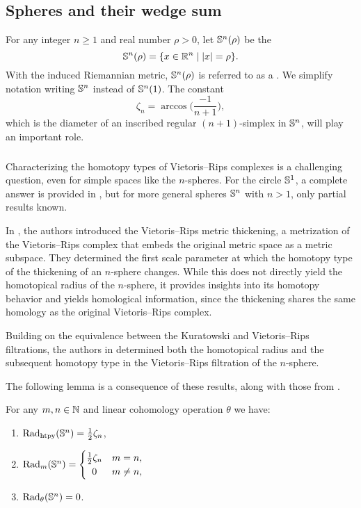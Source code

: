 
\subsection{Spheres and their wedge sum}\label{ss:Sn}

For any integer $n \geq 1$ and real number $\rho > 0$, let $\mathbb{S}^n(\rho)$ be the 
\[
\mathbb{S}^n(\rho) = \{x \in \mathbb{R}^n \mid \lvert x\rvert = \rho\}.
\]
With the induced Riemannian metric, \(\mathbb{S}^n(\rho)\) is referred to as a .
We simplify notation writing \(\mathbb{S}^n\) instead of \(\mathbb{S}^n(1)\).
The constant
\[
\zeta_n = \arccos\Big(\frac{-1}{n+1}\Big),
\]
which is the diameter of an inscribed regular $(n+1)$-simplex in $\mathbb{S}^n$, will play an important role.

\subsubsection{}\label{ss:critical values of Sn}

Characterizing the homotopy types of Vietoris--Rips complexes is a challenging question, even for simple spaces like the $n$-spheres.
For the circle $\mathbb{S}^1$, a complete answer is provided in \cite{adamaszek2017VietorisProduct}, but for more general spheres $\mathbb{S}^n$ with $n>1$, only partial results known.

In \cite{adamaszek2018metric}, the authors introduced the Vietoris--Rips metric thickening, a metrization of the Vietoris--Rips complex that embeds the original metric space as a metric subspace. They determined the first scale parameter at which the homotopy type of the thickening of an \(n\)-sphere changes.
While this does not directly yield the homotopical radius of the \(n\)-sphere, it provides insights into its homotopy behavior and yields homological information, since the thickening shares the same homology as the original Vietoris–Rips complex.

Building on the equivalence between the Kuratowski and Vietoris--Rips filtrations, the authors in \cite{lim2024vietoris} determined both the homotopical radius and the subsequent homotopy type in the Vietoris--Rips filtration of the \(n\)-sphere.

The following lemma is a consequence of these results, along with those from \cite{katz1983filling}.

\lemma
For any $m,n \in \mathbb{N}$ and linear cohomology operation $\theta$ we have:
\begin{enumerate}
	\item \(\mathrm{Rad}_{\mathrm{htpy}}(\mathbb{S}^n) = \frac{1}{2}\zeta_n\),
	\item \(\firstdeath{m}{\bS^n} =
	\begin{cases}
		\frac{1}{2}\zeta_n & m = n, \\
		\hfil 0 & m \neq n,
	\end{cases}\)
	\item \(\mathrm{Rad}_{\theta}(\mathbb{S}^n) = 0\).
\end{enumerate}

